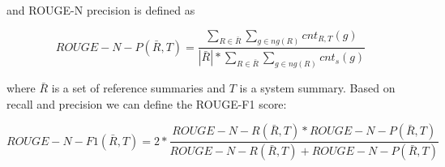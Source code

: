 \documentclass[a4paper,BCOR=10mm]{report}
\numberwithin{lemma}{chapter}
\numberwithin{definition}{chapter}
\begin{document}
and ROUGE-N precision is defined as

\begin{equation}
    \mathit{ROUGE-N-P}(\bar{R}, T) =  \frac{\sum_{R \in \bar{R}} \sum_{g \in \mathit{ng}(R)} \mathit{cnt}_{R,T}(g)}{|\bar{R}| * \sum_{R \in \bar{R}} \sum_{g \in \mathit{ng}(R)} \mathit{cnt}_{s}(g)}
\end{equation}

where $\bar{R}$ is a set of reference summaries and $T$ is a system summary.
Based on recall and precision we can define the ROUGE-F1 score:

\begin{equation}
    \mathit{ROUGE-N-F1}(\bar{R}, T) = 2 * \frac{\mathit{ROUGE-N-R}(\bar{R}, T) * \mathit{ROUGE-N-P}(\bar{R}, T)}{\mathit{ROUGE-N-R}(\bar{R}, T) + \mathit{ROUGE-N-P}(\bar{R}, T)}
\end{equation}
\end{document}
